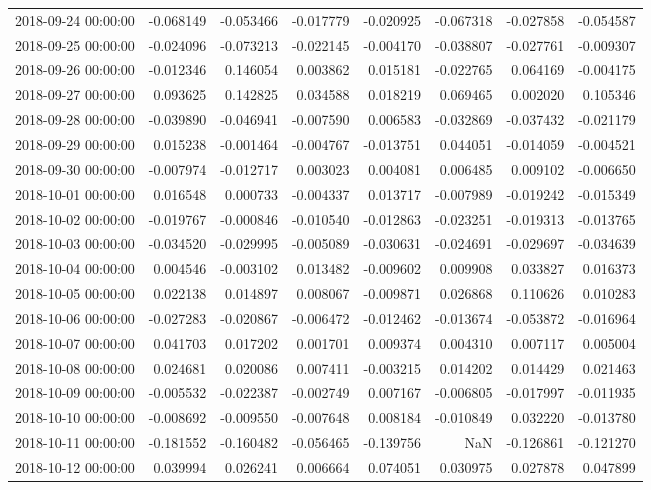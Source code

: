 \begin{tabular}{lrrrrrrr}
2018-09-24 00:00:00 & -0.068149 & -0.053466 & -0.017779 & -0.020925 & -0.067318 & -0.027858 & -0.054587 \\
2018-09-25 00:00:00 & -0.024096 & -0.073213 & -0.022145 & -0.004170 & -0.038807 & -0.027761 & -0.009307 \\
2018-09-26 00:00:00 & -0.012346 & 0.146054 & 0.003862 & 0.015181 & -0.022765 & 0.064169 & -0.004175 \\
2018-09-27 00:00:00 & 0.093625 & 0.142825 & 0.034588 & 0.018219 & 0.069465 & 0.002020 & 0.105346 \\
2018-09-28 00:00:00 & -0.039890 & -0.046941 & -0.007590 & 0.006583 & -0.032869 & -0.037432 & -0.021179 \\
2018-09-29 00:00:00 & 0.015238 & -0.001464 & -0.004767 & -0.013751 & 0.044051 & -0.014059 & -0.004521 \\
2018-09-30 00:00:00 & -0.007974 & -0.012717 & 0.003023 & 0.004081 & 0.006485 & 0.009102 & -0.006650 \\
2018-10-01 00:00:00 & 0.016548 & 0.000733 & -0.004337 & 0.013717 & -0.007989 & -0.019242 & -0.015349 \\
2018-10-02 00:00:00 & -0.019767 & -0.000846 & -0.010540 & -0.012863 & -0.023251 & -0.019313 & -0.013765 \\
2018-10-03 00:00:00 & -0.034520 & -0.029995 & -0.005089 & -0.030631 & -0.024691 & -0.029697 & -0.034639 \\
2018-10-04 00:00:00 & 0.004546 & -0.003102 & 0.013482 & -0.009602 & 0.009908 & 0.033827 & 0.016373 \\
2018-10-05 00:00:00 & 0.022138 & 0.014897 & 0.008067 & -0.009871 & 0.026868 & 0.110626 & 0.010283 \\
2018-10-06 00:00:00 & -0.027283 & -0.020867 & -0.006472 & -0.012462 & -0.013674 & -0.053872 & -0.016964 \\
2018-10-07 00:00:00 & 0.041703 & 0.017202 & 0.001701 & 0.009374 & 0.004310 & 0.007117 & 0.005004 \\
2018-10-08 00:00:00 & 0.024681 & 0.020086 & 0.007411 & -0.003215 & 0.014202 & 0.014429 & 0.021463 \\
2018-10-09 00:00:00 & -0.005532 & -0.022387 & -0.002749 & 0.007167 & -0.006805 & -0.017997 & -0.011935 \\
2018-10-10 00:00:00 & -0.008692 & -0.009550 & -0.007648 & 0.008184 & -0.010849 & 0.032220 & -0.013780 \\
2018-10-11 00:00:00 & -0.181552 & -0.160482 & -0.056465 & -0.139756 & NaN & -0.126861 & -0.121270 \\
2018-10-12 00:00:00 & 0.039994 & 0.026241 & 0.006664 & 0.074051 & 0.030975 & 0.027878 & 0.047899 \\

\end{tabular}
